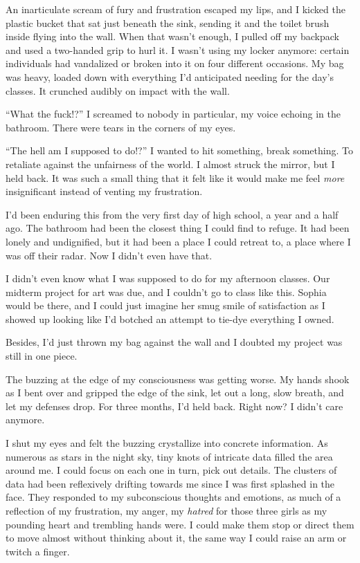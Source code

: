 An inarticulate scream of fury and frustration escaped my lips, and I kicked the plastic bucket that sat just beneath the sink, sending it and the toilet brush inside flying into the wall. When that wasn't enough, I pulled off my backpack and used a two-handed grip to hurl it. I wasn't using my locker anymore: certain individuals had vandalized or broken into it on four different occasions. My bag was heavy, loaded down with everything I'd anticipated needing for the day's classes. It crunched audibly on impact with the wall.

``What the fuck!?'' I screamed to nobody in particular, my voice echoing in the bathroom. There were tears in the corners of my eyes.

``The hell am I supposed to do!?'' I wanted to hit something, break something. To retaliate against the unfairness of the world. I almost struck the mirror, but I held back. It was such a small thing that it felt like it would make me feel \emph{more} insignificant instead of venting my frustration.

I'd been enduring this from the very first day of high school, a year and a half ago. The bathroom had been the closest thing I could find to refuge. It had been lonely and undignified, but it had been a place I could retreat to, a place where I was off their radar. Now I didn't even have that.

I didn't even know what I was supposed to do for my afternoon classes. Our midterm project for art was due, and I couldn't go to class like this. Sophia would be there, and I could just imagine her smug smile of satisfaction as I showed up looking like I'd botched an attempt to tie-dye everything I owned.

Besides, I'd just thrown my bag against the wall and I doubted my project was still in one piece.

The buzzing at the edge of my consciousness was getting worse. My hands shook as I bent over and gripped the edge of the sink, let out a long, slow breath, and let my defenses drop. For three months, I'd held back. Right now? I didn't care anymore.

I shut my eyes and felt the buzzing crystallize into concrete information. As numerous as stars in the night sky, tiny knots of intricate data filled the area around me. I could focus on each one in turn, pick out details. The clusters of data had been reflexively drifting towards me since I was first splashed in the face. They responded to my subconscious thoughts and emotions, as much of a reflection of my frustration, my anger, my \emph{hatred} for those three girls as my pounding heart and trembling hands were. I could make them stop or direct them to move almost without thinking about it, the same way I could raise an arm or twitch a finger.

